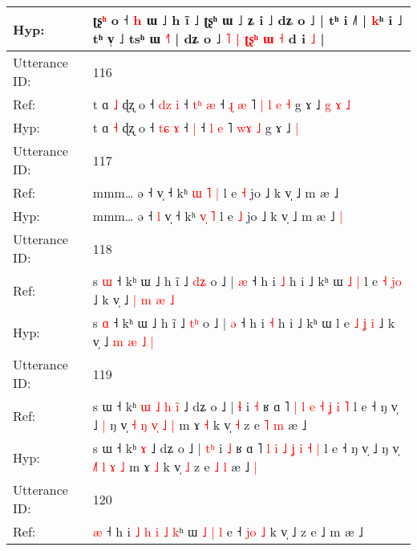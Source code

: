 \documentclass[10pt]{article}
\DeclareRobustCommand{\hl}[1]{{\textcolor{red}{#1}}}
\begin{document}
\begin{longtable}{ll}
 \\
Hyp: & ʈʂ\hl{ʰ} o ˧ \hl{}\hl{h} ɯ ˩ h ĩ ˩ ʈʂʰ ɯ ˩ ʑ i ˩ dʑ o ˩ | tʰ i ˩˥ | \hl{}\hl{k}ʰ i ˩ tʰ v̩ ˩ tsʰ ɯ \hl{˧}˥ | dʑ o ˩\hl{}\hl{}\hl{}\hl{} \hl{˥} \hl{|} \hl{ʈ}\hl{ʂ}\hl{ʰ} \hl{ɯ} \hl{˧} d i\hl{}\hl{}\hl{}\hl{} \hl{˩} |
 \\
\midrule
Utterance ID: & 116 \\
Ref: & t ɑ \hl{˩} ɖʐ o ˧ \hl{d}\hl{z} \hl{i} ˧\hl{ }\hl{t}\hl{ʰ} \hl{æ} ˧ \hl{ɻ} \hl{æ} ˥\hl{ }\hl{|} \hl{l}\hl{ }\hl{e} \hl{˧} g ɤ ˩\hl{ }\hl{g}\hl{ }\hl{ɤ} \hl{˩}
 \\
Hyp: & t ɑ \hl{˧} ɖʐ o ˧ \hl{t}\hl{ɕ} \hl{ɤ} ˧\hl{}\hl{}\hl{} \hl{|} ˧ \hl{l} \hl{e} ˥\hl{}\hl{} \hl{}\hl{w}\hl{ɤ} \hl{˩} g ɤ ˩\hl{}\hl{}\hl{}\hl{} \hl{|}
 \\
\midrule
Utterance ID: & 117 \\
Ref: & mmm… ə ˧\hl{}\hl{} v̩ ˧ kʰ \hl{ɯ}\hl{ }\hl{˥} \hl{|} l e \hl{˧} jo ˩ k v̩ ˩ m æ ˩\hl{}\hl{}
 \\
Hyp: & mmm… ə ˧\hl{ }\hl{l} v̩ ˧ kʰ \hl{}\hl{v}\hl{̩} \hl{˥} l e \hl{˩} jo ˩ k v̩ ˩ m æ ˩\hl{ }\hl{|}
 \\
\midrule
Utterance ID: & 118 \\
Ref: & s \hl{ɯ} ˧ kʰ ɯ ˩ h ĩ ˩ \hl{d}\hl{ʑ} o ˩ | \hl{æ} ˧ h i \hl{˩} h i ˩ kʰ ɯ\hl{ }\hl{˩}\hl{ }\hl{|} l e \hl{˧} \hl{}\hl{j}\hl{o} ˩ k v̩ ˩ \hl{|} \hl{m} \hl{æ} \hl{˩}
 \\
Hyp: & s \hl{ɑ} ˧ kʰ ɯ ˩ h ĩ ˩ \hl{t}\hl{ʰ} o ˩ | \hl{ə} ˧ h i \hl{˧} h i ˩ kʰ ɯ\hl{}\hl{}\hl{}\hl{} l e \hl{˩} \hl{ʝ}\hl{ }\hl{i} ˩ k v̩ ˩ \hl{m} \hl{æ} \hl{˩} \hl{|}
 \\
\midrule
Utterance ID: & 119 \\
Ref: & s ɯ ˧ kʰ\hl{ }\hl{ɯ}\hl{ }\hl{˩}\hl{ }\hl{h} \hl{i}\hl{̃} ˩ dʑ o ˩ | \hl{}\hl{ɬ} i \hl{˧} ʁ ɑ ˥ \hl{|} \hl{l} \hl{e} \hl{˧} \hl{ʝ} \hl{i} \hl{˥} l e ˧ ŋ v̩ ˩\hl{ }\hl{|} ŋ v̩ \hl{˧}\hl{ }\hl{ŋ} \hl{v}\hl{̩} \hl{˩} \hl{|} m ɤ \hl{˧} k v̩ \hl{˧} z e \hl{˥} \hl{m} æ ˩\hl{}\hl{}
 \\
Hyp: & s ɯ ˧ kʰ\hl{}\hl{}\hl{}\hl{}\hl{}\hl{} \hl{}\hl{ɤ} ˩ dʑ o ˩ | \hl{t}\hl{ʰ} i \hl{˩} ʁ ɑ ˥ \hl{l} \hl{i} \hl{˩} \hl{ʝ} \hl{i} \hl{˧} \hl{|} l e ˧ ŋ v̩ ˩\hl{}\hl{} ŋ v̩ \hl{}\hl{˩}\hl{˥} \hl{}\hl{l} \hl{ɤ} \hl{˩} m ɤ \hl{˩} k v̩ \hl{˩} z e \hl{˩} \hl{l} æ ˩\hl{ }\hl{|}
 \\
\midrule
Utterance ID: & 120 \\
Ref: & \hl{æ}\hl{ }˧ h i\hl{ }\hl{˩} \hl{h} \hl{i} \hl{˩}\hl{ }\hl{k}ʰ ɯ\hl{ }\hl{˩} \hl{|} \hl{l} e ˧ \hl{j}\hl{o} \hl{˩} k v̩ ˩ z e ˩ m æ ˩\hl{}\hl{}
 \\

\end{longtable}
\end{document}
